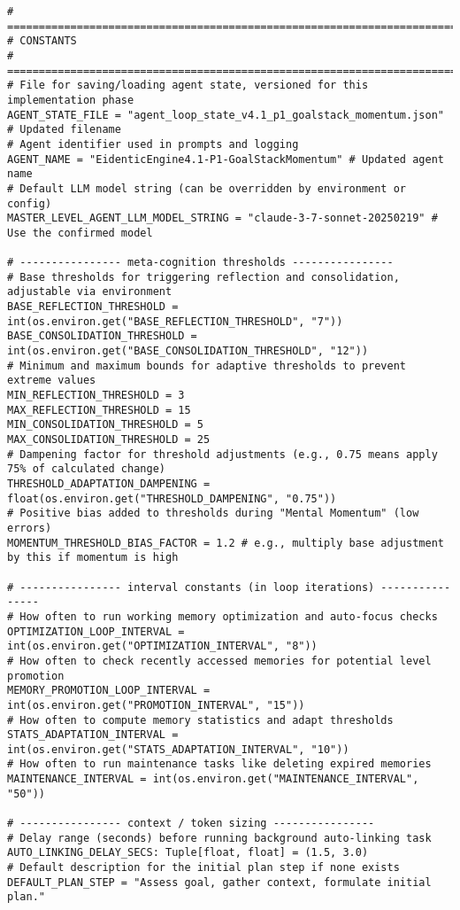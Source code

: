 \documentclass[12pt,a4paper]{article}
\begin{document}
\begin{pageablecode}
\begin{verbatim}
# ==========================================================================
# CONSTANTS
# ==========================================================================
# File for saving/loading agent state, versioned for this implementation phase
AGENT_STATE_FILE = "agent_loop_state_v4.1_p1_goalstack_momentum.json" # Updated filename
# Agent identifier used in prompts and logging
AGENT_NAME = "EidenticEngine4.1-P1-GoalStackMomentum" # Updated agent name
# Default LLM model string (can be overridden by environment or config)
MASTER_LEVEL_AGENT_LLM_MODEL_STRING = "claude-3-7-sonnet-20250219" # Use the confirmed model

# ---------------- meta‑cognition thresholds ----------------
# Base thresholds for triggering reflection and consolidation, adjustable via environment
BASE_REFLECTION_THRESHOLD = int(os.environ.get("BASE_REFLECTION_THRESHOLD", "7"))
BASE_CONSOLIDATION_THRESHOLD = int(os.environ.get("BASE_CONSOLIDATION_THRESHOLD", "12"))
# Minimum and maximum bounds for adaptive thresholds to prevent extreme values
MIN_REFLECTION_THRESHOLD = 3
MAX_REFLECTION_THRESHOLD = 15
MIN_CONSOLIDATION_THRESHOLD = 5
MAX_CONSOLIDATION_THRESHOLD = 25
# Dampening factor for threshold adjustments (e.g., 0.75 means apply 75% of calculated change)
THRESHOLD_ADAPTATION_DAMPENING = float(os.environ.get("THRESHOLD_DAMPENING", "0.75"))
# Positive bias added to thresholds during "Mental Momentum" (low errors)
MOMENTUM_THRESHOLD_BIAS_FACTOR = 1.2 # e.g., multiply base adjustment by this if momentum is high

# ---------------- interval constants (in loop iterations) ----------------
# How often to run working memory optimization and auto-focus checks
OPTIMIZATION_LOOP_INTERVAL = int(os.environ.get("OPTIMIZATION_INTERVAL", "8"))
# How often to check recently accessed memories for potential level promotion
MEMORY_PROMOTION_LOOP_INTERVAL = int(os.environ.get("PROMOTION_INTERVAL", "15"))
# How often to compute memory statistics and adapt thresholds
STATS_ADAPTATION_INTERVAL = int(os.environ.get("STATS_ADAPTATION_INTERVAL", "10"))
# How often to run maintenance tasks like deleting expired memories
MAINTENANCE_INTERVAL = int(os.environ.get("MAINTENANCE_INTERVAL", "50"))

# ---------------- context / token sizing ----------------
# Delay range (seconds) before running background auto-linking task
AUTO_LINKING_DELAY_SECS: Tuple[float, float] = (1.5, 3.0)
# Default description for the initial plan step if none exists
DEFAULT_PLAN_STEP = "Assess goal, gather context, formulate initial plan."


\end{verbatim}
\end{pageablecode}
\end{document}

